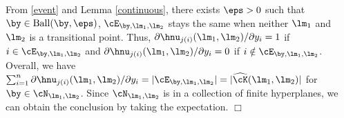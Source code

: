 \documentclass[12pt]{article}
\begin{document}
\vspace{15pt}


  \noindent
From \eqref{event} and Lemma \ref{continuous},
 there exists $\eps>0$ such that $\by\in {\rm Ball}(\by, \eps)$,  $\cE_{\by,\lm_1,\lm_2}$ stays the same when
neither $\lm_1$ and $\lm_2$ is a transitional point.
Thus, $\partial \hnu_{j(i)}(\lm_1,\lm_2)/\partial y_i =1$ if $i\in \cE_{\by,\lm_1,\lm_2}$ and  $\partial \hnu_{j(i)}(\lm_1,\lm_2)/\partial y_i =0$ if $i\notin \cE_{\by,\lm_1,\lm_2}$.
  Overall, we have $\sum_{i=1}^n \partial\hnu_{j(i)}(\lm_1,\lm_2)/\partial y_i=|\cE_{\by,\lm_1,\lm_2}|= |\widehat \cK(\lm_1,\lm_2)|$ for
 $\by \in \cN_{\lm_1,\lm_2}$.
 Since $\cN_{\lm_1,\lm_2}$ is in a collection of finite
 hyperplanes, we can obtain the conclusion by taking the expectation. $\Box$
\end{document}
